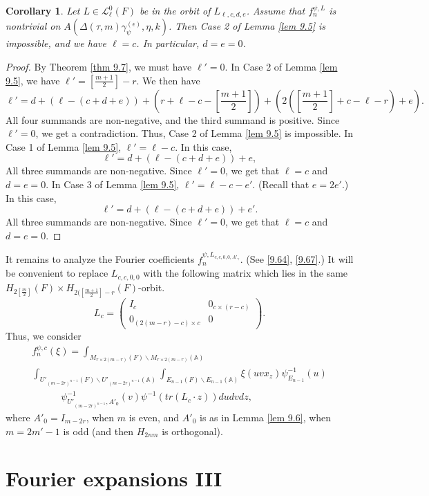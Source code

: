 \documentclass[12pts]{amsart}
\newcommand{\BA}{{\mathbb {A}}}
\newtheorem{cor}[thm]{Corollary}
\begin{document}
\begin{cor}\label{cor 9.8}
	Let $L\in \mathcal{L}_\ell^0(F)$ be in the orbit of $L_{\ell,c,d,e}$. Assume that $f_n^{\psi,L}$ is nontrivial on $A(\Delta(\tau,m)\gamma_\psi^{(\epsilon)},\eta,k)$. Then Case 2 of Lemma \ref{lem 9.5} is impossible, and we have $\ell=c$. In particular, $d=e=0$.
\end{cor}
\begin{proof}
By Theorem \ref{thm 9.7}, we must have $\ell'=0$. In Case 2 of Lemma \ref{lem 9.5}, we have $\ell'=[\frac{m+1}{2}]-r$. We then have
$$
\ell'=d+(\ell-(c+d+e))+(r+\ell-c-[\frac{m+1}{2}])+(2([\frac{m+1}{2}]+c-\ell-r)+e).
$$
All four summands are non-negative, and the third summand is positive. Since $\ell'=0$, we get a contradiction. Thus, Case 2 of Lemma \ref{lem 9.5} is impossible. In Case 1 of Lemma \ref{lem 9.5}, $\ell'=\ell-c$. In this case, 
$$
\ell'=d+(\ell-(c+d+e))+e,
$$
All three summands are non-negative. Since $\ell'=0$, we get that $\ell=c$ and $d=e=0$.	In Case 3 of Lemma \ref{lem 9.5}, $\ell'=\ell-c-e'$. (Recall that $e=2e'$.) In this case,
$$
\ell'=d+(\ell-(c+d+e))+e'.
$$
All three summands are non-negative. Since $\ell'=0$, we get that $\ell=c$ and $d=e=0$.	
\end{proof}
It remains to analyze the Fourier coefficients $f_n^{\psi,L_{c,c,0,0,A'_\gamma}}$. (See \eqref{9.64}, \eqref{9.67}.) It will be convenient to replace $L_{c,c,0,0}$ with the following matrix which lies in the same $H_{2[\frac{m}{2}]}(F)\times H_{2([\frac{m+1}{2}]-r}(F)$-orbit. 
\begin{equation}\label{9.91}
L_c=\begin{pmatrix}I_c&0_{c\times(r-c)}\\0_{(2(m-r)-c)\times c}&0\end{pmatrix}.
\end{equation}
Thus, we consider
\begin{multline}\label{9.92}
f_n^{\psi,c}(\xi)=\int_{M_{r\times 2(m-r)}(F)\backslash M_{r\times 2(m-r)}(\BA)}\\
\int_{U'_{{(m-2r)}^{n-1}}(F)\backslash
	U'_{{(m-2r)}^{n-1}}(\BA)}\int_{E_{n-1}(F)\backslash E_{n-1}(\BA)}\xi(uvx_z)\psi^{-1}_{E_{n-1}}(u)\\
\quad\quad\quad\psi^{-1}_{U'_{(m-2r)^{n-1}},A'_0}(v)\psi^{-1}(tr(L_c\cdot z))dudv dz,
\end{multline}
where $A'_0=I_{m-2r}$, when $m$ is even, and $A'_0$ is as in Lemma \ref{lem 9.6}, when $m=2m'-1$ is odd (and then $H_{2nm}$ is orthogonal). 

\section{Fourier expansions III}
\end{document}
